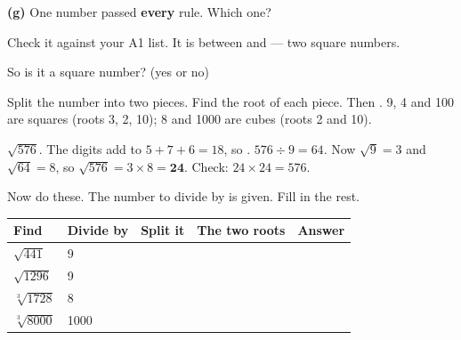 \documentclass[12pt,a4paper]{article}
\begin{document}
\vspace{9pt}
\noindent\textbf{(g)} One number passed \textbf{every} rule. Which one?
\blank[3.0cm]

\vspace{6pt}
\noindent\hspace*{1em}Check it against your A1 list. It is between
\blank[1.4cm] and \blank[1.4cm] --- two square numbers.

\vspace{6pt}
\noindent\hspace*{1em}So is it a square number? \blank[2.4cm] (yes or no)


\begin{remember}
  Split the number into two pieces. Find the root of each piece. Then
  .  9, 4 and 100 are squares (roots
  3, 2, 10); 8 and 1000 are cubes (roots 2 and 10).

  \smallskip
   $\sqrt{576}$. The digits add to $5 + 7 + 6 = 18$, so . $576 \div 9 = 64$. Now $\sqrt{9} = 3$ and $\sqrt{64} = 8$, so
  $\sqrt{576} = 3 \times 8 = \mathbf{24}$. Check: $24 \times 24 = 576$.
\end{remember}

\noindent Now do these. The number to divide by is given. Fill in the rest.

\vspace{8pt}
\noindent
\begin{tabularx}{\textwidth}{|p{2.2cm}|p{1.8cm}|X|X|p{1.9cm}|}
  \hline
  \textbf{Find} & \textbf{Divide by} & \textbf{Split it} &
  \textbf{The two roots} & \textbf{Answer} \\
  \hline
  $\sqrt{441}$    \rule[-0.75em]{0pt}{2.1em} & 9    & & & \\ \hline
  $\sqrt{1296}$   \rule[-0.75em]{0pt}{2.1em} & 9    & & & \\ \hline
  $\sqrt[3]{1728}$\rule[-0.75em]{0pt}{2.1em} & 8    & & & \\ \hline
  $\sqrt[3]{8000}$\rule[-0.75em]{0pt}{2.1em} & 1000 & & & \\ \hline
\end{tabularx}
\end{document}
